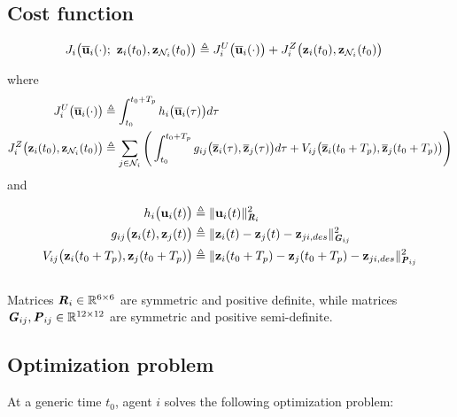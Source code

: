 \subsection{Cost function}

\begin{align}
  J_i \big(\overline{\bm{\mathbf{u}}}_i (\cdot);\ \bm{\mathbf{z}}_i(t_0), \bm{\mathbf{z}}_{\mathcal{N}_i}(t_0)\big) &\triangleq
    J_i^U \big(\overline{\bm{\mathbf{u}}}_i (\cdot) \big) +
    J_i^Z \big(\bm{\mathbf{z}}_i (t_0), \bm{\mathbf{z}}_{\mathcal{N}_i}(t_0)\big)
\end{align}

where
\begin{align}
  J_i^U \big(\overline{\bm{\mathbf{u}}}_i (\cdot)\big) &\triangleq
    \int_{t_0}^{t_0 + T_p} h_i \big(\overline{\bm{\mathbf{u}}}_i (\tau)\big) d \tau \\
  J_i^Z \big(\bm{\mathbf{z}}_i (t_0), \bm{\mathbf{z}}_{\mathcal{N}_i}(t_0)\big) & \triangleq
    \sum_{j \in \mathcal{N}_i} \Bigg(\int_{t_0}^{t_0 + T_p} g_{ij} \big(\overline{\bm{\mathbf{z}}}_i (\tau), \overline{\bm{\mathbf{z}}}_j (\tau)\big) d \tau +
    V_{ij} \big(\overline{\bm{\mathbf{z}}}_i (t_0 + T_p), \overline{\bm{\mathbf{z}}}_j (t_0 + T_p)\big)\Bigg)
\end{align}
and

\begin{align}
  h_i \big(\bm{\mathbf{u}}_i(t) \big)
    &\triangleq \| \bm{\mathbf{u}}_i(t)\|_{\bm{\mathit{R}}_i}^2 \\
  g_{ij}\big(\bm{\mathbf{z}}_i(t), \bm{\mathbf{z}}_j(t)\big)
    & \triangleq \| \bm{\mathbf{z}}_i(t) - \bm{\mathbf{z}}_j(t) - \bm{\mathbf{z}}_{ji,des} \|_{\bm{\mathit{G}}_{ij}}^2 \\
  V_{ij} \big(\bm{\mathbf{z}}_i (t_0 + T_p), \bm{\mathbf{z}}_j (t_0 + T_p)\big)
    & \triangleq \| \bm{\mathbf{z}}_i(t_0 + T_p) - \bm{\mathbf{z}}_j(t_0 + T_p) - \bm{\mathbf{z}}_{ji,des} \|_{\bm{\mathit{P}}_{ij}}^2
\end{align}\\
Matrices $\bm{\mathit{R}}_i \in \mathbb{R}^{6 \times 6}$ are symmetric and positive
definite, while matrices $\bm{\mathit{G}}_{ij}, \bm{\mathit{P}}_{ij} \in \mathbb{R}^{12 \times 12}$ are
symmetric and positive semi-definite.



\subsection{Optimization problem}

At a generic time $t_0$, agent $i$ solves the following optimization problem:

